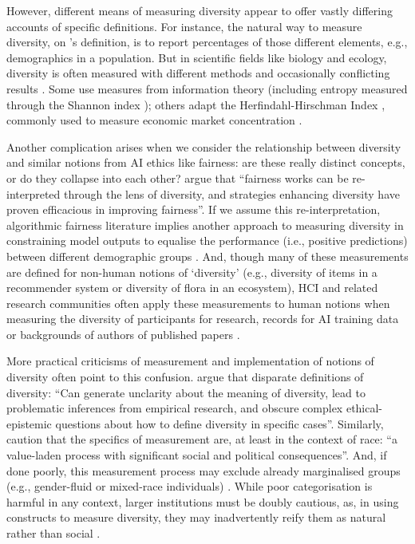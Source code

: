 However, different means of measuring diversity appear to offer vastly differing accounts of specific definitions. For instance, the natural way to measure diversity, on \textcite{page_diversity_2010}'s definition, is to report percentages of those different elements, e.g., demographics in a population. But in scientific fields like biology and ecology, diversity is often measured with different methods and occasionally conflicting results \cite{xu2020diversity}. Some use measures from information theory (including entropy measured through the Shannon index \cite{shannon1948mathematical}); others adapt the Herfindahl-Hirschman Index \cite{rhoades1993herfindahl}, commonly used to measure economic market concentration \cite{budescu2012measure,acuna2021ai,shannon1948mathematical,rhoades1993herfindahl}.

Another complication arises when we consider the relationship between diversity and similar notions from AI ethics like fairness: are these really distinct concepts, or do they collapse into each other?
\textcite{zhao2023fairness} argue that ``fairness works can be re-interpreted through the lens of diversity, and strategies enhancing diversity have proven efficacious in improving fairness''. If we assume this re-interpretation, algorithmic fairness literature implies another approach to measuring diversity in constraining model outputs to equalise the performance (i.e., positive predictions) between different demographic groups \cite{barocas2023fairness}. And, though many of these measurements are defined for non-human notions of `diversity' (e.g., diversity of items in a recommender system or diversity of flora in an ecosystem), HCI and related research communities often apply these measurements to human notions when measuring the diversity of participants for research, records for AI training data or backgrounds of authors of published papers \cite{linxen2021weird,himmelsbach2019we,zhao2024position,rojas2022dollar,acuna2021ai}. 

More practical criticisms of measurement and implementation of notions of diversity often point to this confusion. \textcite{steel_multiple_2018} argue that disparate definitions of diversity: ``Can generate unclarity about the meaning of diversity, lead to problematic inferences from empirical research, and obscure complex ethical-epistemic questions about how to define diversity in specific cases''. Similarly, \textcite{abdu2023empirical} caution that the specifics of measurement are, at least in the context of race: ``a value-laden process with significant social and political consequences''. And, if done poorly, this measurement process may exclude already marginalised groups (e.g., gender-fluid or mixed-race individuals) \cite{scheuerman2019computers}. While poor categorisation is harmful in any context, larger institutions must be doubly cautious, as, in using constructs to measure diversity, they may inadvertently reify them as natural rather than social \cite{scheuerman2021auto}. 

